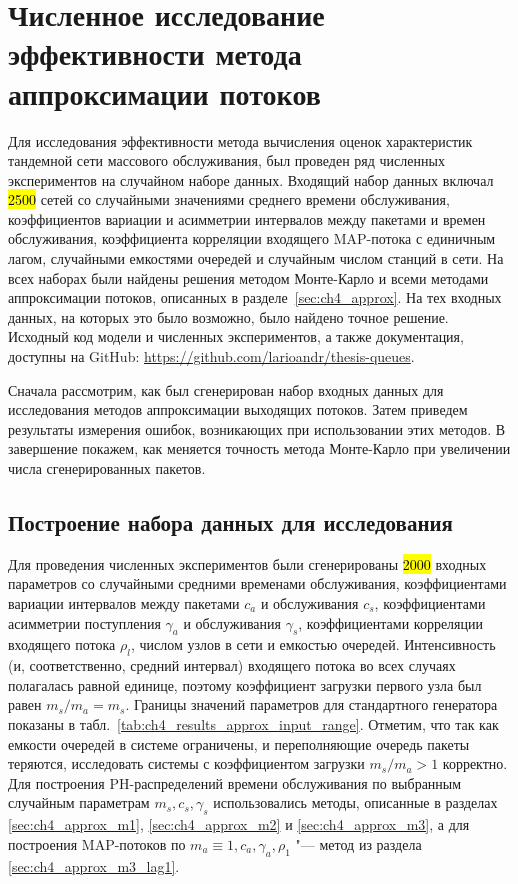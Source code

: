 \section{Численное исследование эффективности метода аппроксимации потоков}

Для исследования эффективности метода вычисления оценок характеристик тандемной сети массового обслуживания, был проведен ряд численных экспериментов на случайном наборе данных. Входящий набор данных включал \hl{2500} сетей со случайными значениями среднего времени обслуживания, коэффициентов вариации и асимметрии интервалов между пакетами и времен обслуживания, коэффициента корреляции входящего MAP-потока с единичным лагом, случайными емкостями очередей и случайным числом станций в сети. На всех наборах были найдены решения методом Монте-Карло и всеми методами аппроксимации потоков, описанных в разделе~\ref{sec:ch4_approx}. На тех входных данных, на которых это было возможно, было найдено точное решение. Исходный код модели и численных экспериментов, а также документация, доступны на GitHub: \url{https://github.com/larioandr/thesis-queues}.

Сначала рассмотрим, как был сгенерирован набор входных данных для исследования методов аппроксимации выходящих потоков. Затем приведем результаты измерения ошибок, возникающих при использовании этих методов. В завершение покажем, как меняется точность метода Монте-Карло при увеличении числа сгенерированных пакетов.


\subsection{Построение набора данных для исследования}

Для проведения численных экспериментов были сгенерированы \hl{2000} входных параметров со случайными средними временами обслуживания, коэффициентами вариации интервалов между пакетами $c_a$ и обслуживания $c_s$, коэффициентами асимметрии поступления $\gamma_a$ и обслуживания $\gamma_s$, коэффициентами корреляции входящего потока $\rho_l$, числом узлов в сети и емкостью очередей. Интенсивность (и, соответственно, средний интервал) входящего потока во всех случаях полагалась равной единице, поэтому коэффициент загрузки первого узла был равен $m_s / m_a = m_s$. Границы значений параметров для стандартного генератора показаны в табл.~\ref{tab:ch4_results_approx_input_range}. Отметим, что так как емкости очередей в системе ограничены, и переполняющие очередь пакеты теряются, исследовать системы с коэффициентом загрузки $m_s / m_a > 1$ корректно. Для построения PH-распределений времени обслуживания по выбранным случайным параметрам $m_s, c_s, \gamma_s$ использовались методы, описанные в разделах \ref{sec:ch4_approx_m1}, \ref{sec:ch4_approx_m2} и \ref{sec:ch4_approx_m3}, а для построения MAP-потоков по $m_a \equiv 1, c_a, \gamma_a, \rho_1$ "--- метод из раздела \ref{sec:ch4_approx_m3_lag1}.

